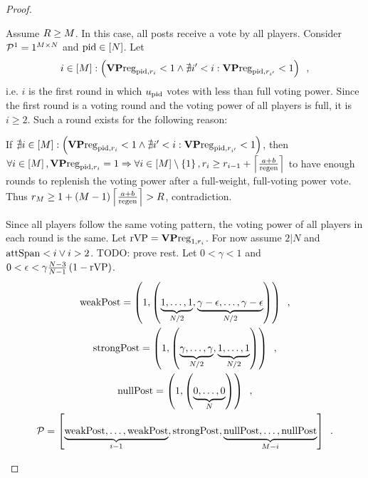 \begin{proof}
\begin{itemize}
    Assume $\rounds \geq \postlen$. In this case, all posts receive a vote by
    all players. Consider $\postlist^1 = 1^{\postlen \times \playerlen}$ and
    $\pid \in \left[\playerlen\right]$. Let
    \begin{equation*}
      i \in \left[\postlen\right] :\left(\votpowvecreg_{\pid, \round_i} < 1
      \wedge \nexists i' < i: \votpowvecreg_{\pid, \round_{i'}} < 1\right)
      \enspace,
    \end{equation*}
    i.e. $i$ is the first round in which $u_\pid$ votes with less than full
    voting power. Since the first round is a voting round and the voting power
    of all players is full, it is $i \geq 2$. Such a round exists for the
    following reason:

    If $\nexists i \in \left[\postlen\right] :\left(\votpowvecreg_{\pid,
    \round_i} < 1 \wedge \nexists i' < i: \votpowvecreg_{\pid, \round_{i'}} <
    1\right)$, then $\forall i \in \left[\postlen\right], \votpowvecreg_{\pid,
    \round_i} = 1 \Rightarrow \forall i \in \left[\postlen\right] \setminus
    \left\{1\right\}, \round_i \geq \round_{i - 1} + \ceil*{\frac{a +
    b}{\regen}}$ to have enough rounds to replenish the voting power after a
    full-weight, full-voting power vote. Thus $\round_\postlen \geq 1 +
    \left(\postlen - 1\right)\ceil*{\frac{a + b}{\regen}} > \rounds$,
    contradiction.

    Since all players follow the same voting pattern, the voting power of all
    players in each round is the same. Let $\rvp =
    \votpowvecreg_{1, \round_i}$. For now assume $2 | N$ and $\attspan < i \vee
    i > 2$. TODO: prove rest. Let $0 < \gamma < 1$ and $0 < \epsilon <
    \gamma\frac{\playerlen - 3}{\playerlen - 1}\left(1 -
    \rvp\right)$.
    \begin{gather*}
      \weakpost = \left(1, \left(\underbrace{1, \dots, 1}_{\playerlen/2},
      \underbrace{\gamma - \epsilon, \dots, \gamma -
      \epsilon}_{\playerlen/2}\right)\right) \enspace, \\
      \strongpost = \left(1, \left(\underbrace{\gamma, \dots,
      \gamma}_{\playerlen/2}, \underbrace{1, \dots,
      1}_{\playerlen/2}\right)\right) \enspace, \\
      \nullpost = \left(1, \left(\underbrace{0, \dots,
      0}_{\playerlen}\right)\right) \enspace, \\
      \postlist = \left[\underbrace{\weakpost, \dots, \weakpost}_{i - 1},
      \strongpost, \underbrace{\nullpost, \dots, \nullpost}_{\postlen -
      i}\right] \enspace.
    \end{gather*}


\end{itemize}
\end{proof}
